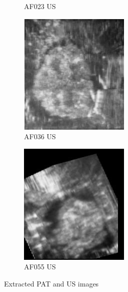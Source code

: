 \begin{figure}
\begin{subfigure}[b]{.24\linewidth}
\caption{AF023 US}
\end{subfigure}
\begin{subfigure}[b]{.24\linewidth}
\includegraphics[width=\linewidth]{Figs/US36.png}
\caption{AF036 US}
\end{subfigure}
\begin{subfigure}[b]{.24\linewidth}
\includegraphics[width=\linewidth]{Figs/US55_13.jpg}
\caption{AF055 US}
\end{subfigure}
\caption{Extracted PAT and US images}
\label{pat_us_example}
\end{figure}

